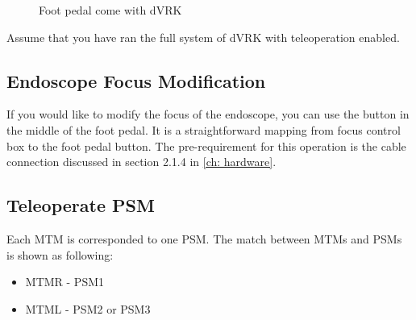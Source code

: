 \begin{figure}[H]
\centering
{}
\hfil
{}
\caption{Foot pedal come with dVRK}
\label{fig:origin_footpedal}
\end{figure}

Assume that you have ran the full system of dVRK with teleoperation enabled.

\subsection{Endoscope Focus Modification}

If you would like to modify the focus of the endoscope, you can use the button in the middle of the foot pedal. It is a straightforward mapping from focus control box to the foot pedal button. The pre-requirement for this operation is the cable connection discussed in section 2.1.4 in \autoref{ch: hardware}.

\subsection{Teleoperate PSM}

Each MTM is corresponded to one PSM. The match between MTMs and PSMs is shown as following:

\begin{itemize}
    \item MTMR - PSM1
    \item MTML - PSM2 or PSM3
\end{itemize}

